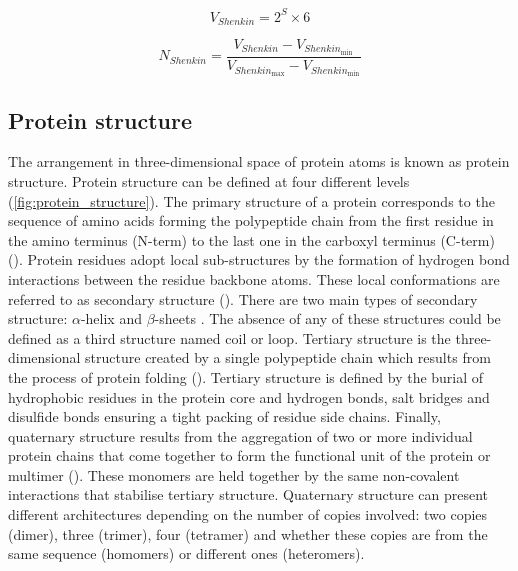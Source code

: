 \begin{equation}
V_{Shenkin} = 2^S \times 6
\label{eq:shenkin}
\end{equation}

\begin{equation}
N_{Shenkin} = \frac{V_{Shenkin} - V_{Shenkin_{\text{min}}}}{V_{Shenkin_{\text{max}}} - V_{Shenkin_{\text{min}}}}
\label{eq:shenkin_norm}
\end{equation}

\subsection{Protein structure}

The arrangement in three-dimensional space of protein atoms is known as protein structure. Protein structure can be defined at four different levels (\autoref{fig:protein_structure}). The primary structure of a protein corresponds to the sequence of amino acids forming the polypeptide chain from the first residue in the amino terminus (N-term) to the last one in the carboxyl terminus (C-term) (). Protein residues adopt local sub-structures by the formation of hydrogen bond interactions between the residue backbone atoms. These local conformations are referred to as secondary structure (). There are two main types of secondary structure: $\alpha$-helix and $\beta$-sheets \cite{PAULING_1951_SS}. The absence of any of these structures could be defined as a third structure named coil or loop. Tertiary structure is the three-dimensional structure created by a single polypeptide chain which results from the process of protein folding (). Tertiary structure is defined by the burial of hydrophobic residues in the protein core and hydrogen bonds, salt bridges and disulfide bonds ensuring a tight packing of residue side chains. Finally, quaternary structure results from the aggregation of two or more individual protein chains that come together to form the functional unit of the protein or multimer (). These monomers are held together by the same non-covalent interactions that stabilise tertiary structure. Quaternary structure can present different architectures depending on the number of copies involved: two copies (dimer), three (trimer), four (tetramer) and whether these copies are from the same sequence (homomers) or different ones (heteromers).

